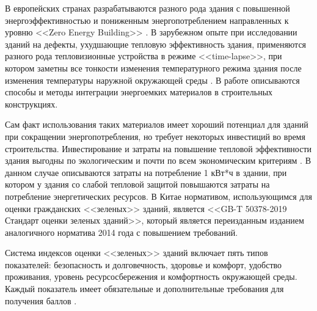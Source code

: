 
В европейских странах разрабатываются разного рода здания с повышенной энергоэффективностью и пониженным энергопотреблением направленных к уровню <<Zero Energy Building>> \cite{2017buee_MORCK_240}.
В зарубежном опыте при исследовании зданий на дефекты, ухудшающие тепловую эффективность здания, применяются разного рода тепловизионные устройства в режиме <<time-lapse>>,
при котором заметны все тонкости изменения температурного режима здания после изменения температуры наружной окружающей среды \cite{2015bueemethod_FOX_95,2016bueemethod_FOX_317}.
В работе \cite{2014buee_MEMON_870} описываются способы и методы интеграции энергоемких материалов в строительных конструкциях.


Сам факт использования таких материалов имеет хороший потенциал для зданий при сокращении энергопотребления, но требует некоторых инвестиций во время строительства.
Инвестирование и затраты на повышение тепловой эффективности здания выгодны по экологическим и почти по всем экономическим критериям \cite{2017buee_ADAMCZYK_421}.
В данном случае описываются затраты на потребление 1 кВт*ч в здании, при котором у здания со слабой тепловой защитой повышаются затраты на потребление энергетических ресурсов. 
В Китае нормативом, использующимся для оценки гражданских <<зеленых>> зданий, является <<GB-T 50378-2019 Стандарт оценки зеленых зданий>>,
который является переизданным изданием аналогичного норматива 2014 года с повышением требований.


Система индексов оценки <<зеленых>> зданий включает пять типов показателей: безопасность и долговечность, здоровье и комфорт, удобство проживания,
уровень ресурсосбережения и комфортность окружающей среды. Каждый показатель имеет обязательные и дополнительные требования для получения баллов \cite{2020buee_Gushin_EnergysaveTrends}.






